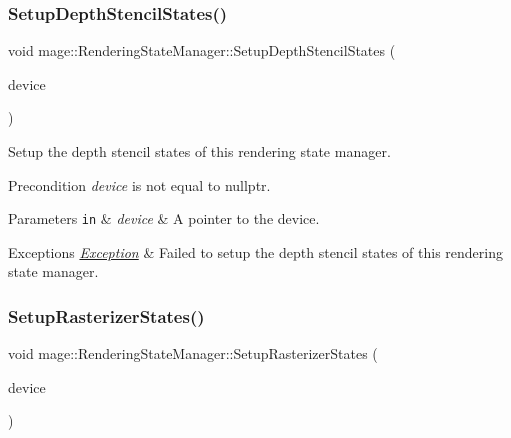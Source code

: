 \subsubsection{\texorpdfstring{Setup\+Depth\+Stencil\+States()}{SetupDepthStencilStates()}}
{\footnotesize\ttfamily void mage\+::\+Rendering\+State\+Manager\+::\+Setup\+Depth\+Stencil\+States (\begin{DoxyParamCaption}\item[{I\+D3\+D11\+Device5 $\ast$}]{device }\end{DoxyParamCaption})\hspace{0.3cm}{\ttfamily [private]}}

Setup the depth stencil states of this rendering state manager.

\begin{DoxyPrecond}{Precondition}
{\itshape device} is not equal to {\ttfamily nullptr}. 
\end{DoxyPrecond}

\begin{DoxyParams}[1]{Parameters}
\mbox{\tt in}  & {\em device} & A pointer to the device. \\
\hline
\end{DoxyParams}

\begin{DoxyExceptions}{Exceptions}
{\em \hyperlink{classmage_1_1_exception}{Exception}} & Failed to setup the depth stencil states of this rendering state manager. \\
\hline
\end{DoxyExceptions}
\hypertarget{classmage_1_1_rendering_state_manager_a74e37deb853254b87a0f61af178ad703}{}\label{classmage_1_1_rendering_state_manager_a74e37deb853254b87a0f61af178ad703} 
\subsubsection{\texorpdfstring{Setup\+Rasterizer\+States()}{SetupRasterizerStates()}}
{\footnotesize\ttfamily void mage\+::\+Rendering\+State\+Manager\+::\+Setup\+Rasterizer\+States (\begin{DoxyParamCaption}\item[{I\+D3\+D11\+Device5 $\ast$}]{device }\end{DoxyParamCaption})\hspace{0.3cm}{\ttfamily [private]}}

